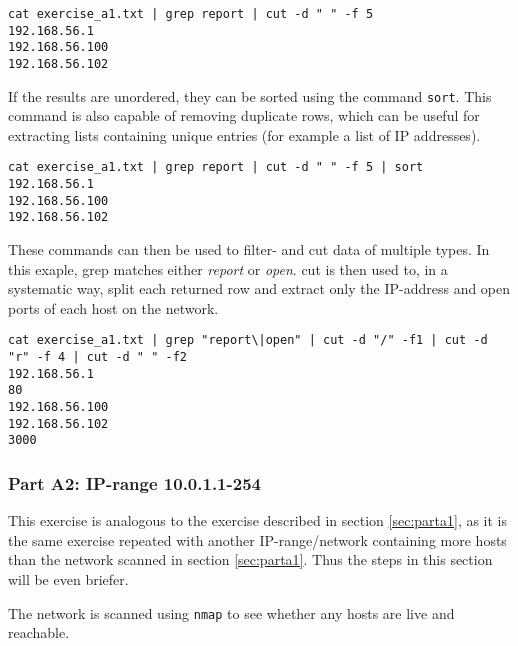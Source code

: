 \begin{lstlisting}[numbers=none, language={}, frame=single, framexleftmargin={0.2em}]
cat exercise_a1.txt | grep report | cut -d " " -f 5
192.168.56.1
192.168.56.100
192.168.56.102
\end{lstlisting}

If the results are unordered, they can be sorted using the command
\texttt{sort}. This command is also capable of removing duplicate
rows, which can be useful for extracting lists containing unique
entries (for example a list of IP addresses).

\begin{lstlisting}[numbers=none, language={}, frame=single, framexleftmargin={0.2em}]
cat exercise_a1.txt | grep report | cut -d " " -f 5 | sort
192.168.56.1
192.168.56.100
192.168.56.102
\end{lstlisting}

These commands can then be used to filter- and cut data of multiple
types. In this exaple, grep matches either \textit{report} or \textit{open}.
cut is then used to, in a systematic way, split each returned row and extract
only the IP-address and open ports of each host on the network.

\begin{lstlisting}[numbers=none, language={}, frame=single, framexleftmargin={0.2em}]
cat exercise_a1.txt | grep "report\|open" | cut -d "/" -f1 | cut -d "r" -f 4 | cut -d " " -f2
192.168.56.1
80
192.168.56.100
192.168.56.102
3000
\end{lstlisting}

\subsubsection{Part A2: IP-range 10.0.1.1-254}
This exercise is analogous to the exercise described in section \ref{sec:parta1},
as it is the same exercise repeated with another IP-range/network containing
more hosts than the network scanned in section \ref{sec:parta1}. Thus the steps in
this section will be even briefer.

The network is scanned using \texttt{nmap} to see whether any hosts are
live and reachable.

